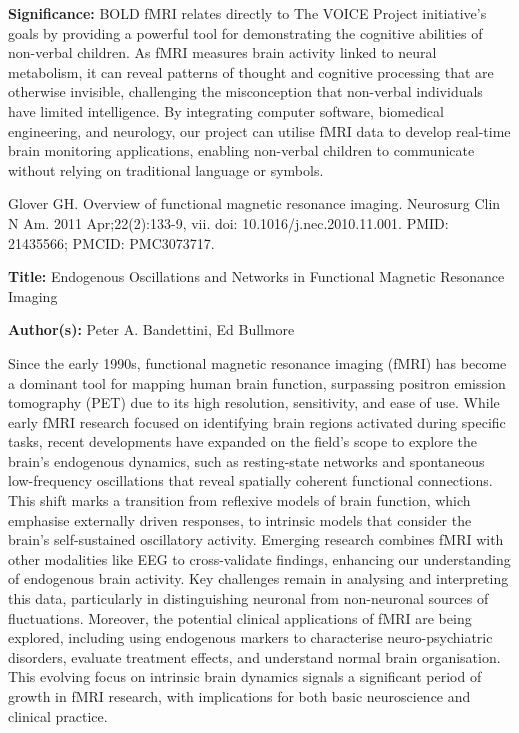 \documentclass[12pt, research paper]{report}
\begin{document}
	\noindent \textbf{Significance:} BOLD fMRI relates directly to The VOICE Project initiative's goals by providing a powerful tool for demonstrating the cognitive abilities of non-verbal children. As fMRI measures brain activity linked to neural metabolism, it can reveal patterns of thought and cognitive processing that are otherwise invisible, challenging the misconception that non-verbal individuals have limited intelligence. By integrating computer software, biomedical engineering, and neurology, our project can utilise fMRI data to develop real-time brain monitoring applications, enabling non-verbal children to communicate without relying on traditional language or symbols. 
	\bigskip

	\noindent Glover GH. Overview of functional magnetic resonance imaging. Neurosurg Clin N Am. 2011 Apr;22(2):133-9, vii. doi: 10.1016/j.nec.2010.11.001. PMID: 21435566; PMCID: PMC3073717.
	\bigskip
	\bigskip
	
	\noindent \textbf{Title:} Endogenous Oscillations and Networks in Functional Magnetic Resonance Imaging
	
	\noindent \textbf{Author(s):} Peter A. Bandettini, Ed Bullmore
	\bigskip
	
	Since the early 1990s, functional magnetic resonance imaging (fMRI) has become a dominant tool for mapping human brain function, surpassing positron emission tomography (PET) due to its high resolution, sensitivity, and ease of use. While early fMRI research focused on identifying brain regions activated during specific tasks, recent developments have expanded on the field's scope to explore the brain's endogenous dynamics, such as resting-state networks and spontaneous low-frequency oscillations that reveal spatially coherent functional connections. This shift marks a transition from reflexive models of brain function, which emphasise externally driven responses, to intrinsic models that consider the brain's self-sustained oscillatory activity. Emerging research combines fMRI with other modalities like EEG to cross-validate findings, enhancing our understanding of endogenous brain activity. Key challenges remain in analysing and interpreting this data, particularly in distinguishing neuronal from non-neuronal sources of fluctuations. Moreover, the potential clinical applications of fMRI are being explored, including using endogenous markers to characterise neuro-psychiatric disorders, evaluate treatment effects, and understand normal brain organisation. This evolving focus on intrinsic brain dynamics signals a significant period of growth in fMRI research, with implications for both basic neuroscience and clinical practice.
	\bigskip 
	
\end{document}
